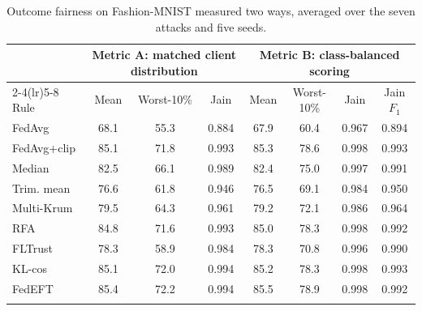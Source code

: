 \begin{table}[!tbp]
\centering
\caption{Outcome fairness on Fashion-MNIST measured two ways, averaged over the seven attacks and five seeds.}
\label{tab:fair_balanced}
\setlength{\tabcolsep}{3.6pt}
\footnotesize
\begin{tabular}{@{}lccccccc@{}}
\toprule
& \multicolumn{3}{c}{Metric A: matched client distribution}& \multicolumn{4}{c}{Metric B: class-balanced scoring}\\
\cmidrule(lr){2-4}\cmidrule(lr){5-8}
Rule & Mean & Worst-10\% & Jain & Mean & Worst-10\% & Jain & Jain $F_1$\\
\midrule
FedAvg & 68.1 & 55.3 & 0.884 & 67.9 & 60.4 & 0.967 & 0.894\\
FedAvg+clip & 85.1 & 71.8 & 0.993 & 85.3 & 78.6 & 0.998 & 0.993\\
Median & 82.5 & 66.1 & 0.989 & 82.4 & 75.0 & 0.997 & 0.991\\
Trim. mean & 76.6 & 61.8 & 0.946 & 76.5 & 69.1 & 0.984 & 0.950\\
Multi-Krum & 79.5 & 64.3 & 0.961 & 79.2 & 72.1 & 0.986 & 0.964\\
RFA & 84.8 & 71.6 & 0.993 & 85.0 & 78.3 & 0.998 & 0.992\\
FLTrust & 78.3 & 58.9 & 0.984 & 78.3 & 70.8 & 0.996 & 0.990\\
KL-cos & 85.1 & 72.0 & 0.994 & 85.2 & 78.3 & 0.998 & 0.993\\
\midrule
FedEFT  & 85.4 & 72.2 & 0.994 & 85.5 & 78.9 & 0.998 & 0.992\\
\botrule
\end{tabular}
\end{table}
